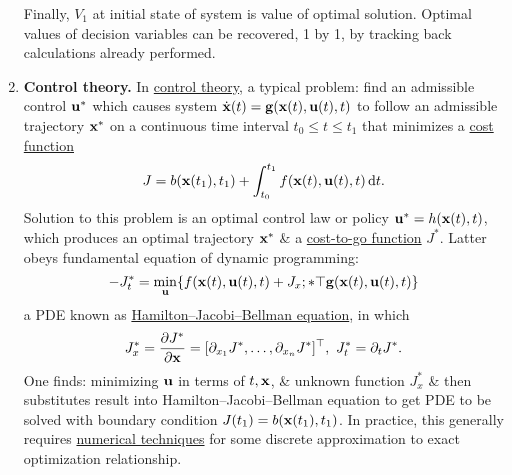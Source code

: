 \documentclass{article}
\begin{document}
\begin{enumerate}
	Finally, $V_1$ at initial state of system is value of optimal solution. Optimal values of decision variables can be recovered, 1 by 1, by tracking back calculations already performed.
	\item {\bf Control theory.} In \href{https://en.wikipedia.org/wiki/Control_theory}{control theory}, a typical problem: find an admissible control ${\bf u}^*$ which causes system $\dot{\bf x}(t) = {\bf g}({\bf x}(t),{\bf u}(t),t)$ to follow an admissible trajectory ${\bf x}^*$ on a continuous time interval $t_0\le t\le t_1$ that minimizes a \href{https://en.wikipedia.org/wiki/Loss_function}{cost function}
	\begin{equation*}
		J = b({\bf x}(t_1),t_1) + \int_{t_0}^{t_1} f({\bf x}(t),{\bf u}(t),t)\,{\rm d}t.
	\end{equation*}
	Solution to this problem is an optimal control law or policy ${\bf u}^* = h({\bf x}(t),t)$, which produces an optimal trajectory ${\bf x}^*$ \& a \href{https://en.wikipedia.org/wiki/Cost-to-go_function}{cost-to-go function} $J^*$. Latter obeys fundamental equation of dynamic programming:
	\begin{equation*}
		-J_t^* = \min_{\bf u} \{f({\bf x}(t),{\bf u}(t),t) + {J_x^^{*\top}{\bf g}({\bf x}(t),{\bf u}(t),t)\}
	\end{equation*}
	a PDE known as \href{https://en.wikipedia.org/wiki/Hamilton%E2%80%93Jacobi%E2%80%93Bellman_equation}{Hamilton--Jacobi--Bellman equation}, in which
	\begin{equation*}
		J_x^* = \frac{\partial J^*}{\partial{\bf x}} = [\partial_{x_1}J^*,\ldots,\partial_{x_n}J^*]^\top,\ J_t^* = \partial_tJ^*.
	\end{equation*}
	One finds: minimizing ${\bf u}$ in terms of $t,{\bf x}$, \& unknown function $J_x^*$ \& then substitutes result into Hamilton--Jacobi--Bellman equation to get PDE to be solved with boundary condition $J(t_1) = b({\bf x}(t_1),t_1)$. In practice, this generally requires \href{https://en.wikipedia.org/wiki/Numerical_partial_differential_equations}{numerical techniques} for some discrete approximation to exact optimization relationship.


\end{enumerate}
\end{document}
